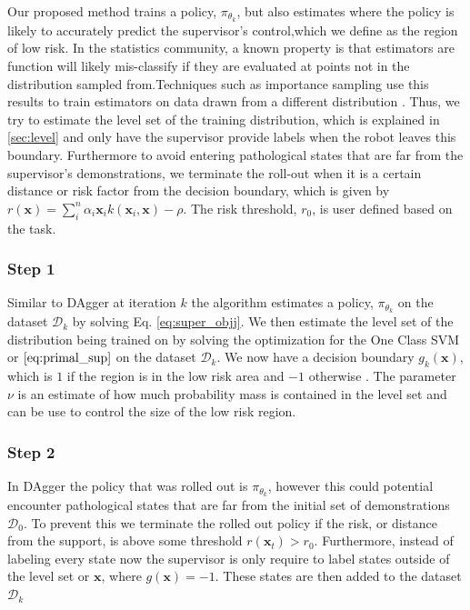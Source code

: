 \documentclass[10pt, conference]{ieeeconf}      %
\newcommand{\bx}{\mathbf{x}}
\begin{document}
Our proposed method trains a policy, $\pi_{\theta_k}$, but also estimates where the policy is likely to accurately predict the supervisor's control,which we define as the region of low risk.  In the statistics community, a known property is that estimators are function will likely mis-classify if they are evaluated at points not in the distribution sampled from.Techniques such as importance sampling use this results to train estimators on data drawn from a different distribution \cite{tokdar2010importance}.  Thus, we try to estimate the level set of the training distribution, which is explained in \ref{sec:level} and only have the supervisor provide labels when the robot leaves this boundary. Furthermore to avoid entering pathological states that are far from the supervisor's demonstrations, we terminate the roll-out when it is a certain distance or risk factor from the decision boundary, which is given by $r(\bx) = \sum_i^n \alpha_i \bx_i k(\bx_i,\bx)-\rho$. The risk threshold, $r_0$, is user defined based on the task. 

\subsubsection{Step 1}
Similar to DAgger at iteration $k$ the algorithm estimates a policy, $\pi_{\theta_k}$ on the dataset $\mathcal{D}_k$ by solving Eq. \ref{eq:super_objj}. We then estimate the level set of the distribution being trained on by solving the optimization for the One Class SVM or $\ref{eq:primal_sup}$ on the dataset $\mathcal{D}_k$. We now have a decision boundary $g_k(\bx)$, which is $1$ if the region is in the low risk area and $-1$ otherwise . The parameter $\nu$ is an estimate of how much probability mass is contained in the level set and can be use to control the size of the low risk region. 
 
 
 \subsubsection{Step 2}
 In DAgger the policy that was rolled out is $\pi_{\theta_k}$, however this could potential encounter pathological states that are far from the initial set of demonstrations $\mathcal{D}_0$. To prevent this we terminate the rolled out policy if the risk, or distance from the support, is above some threshold $r(\bx_t) > r_0$.  Furthermore, instead of labeling every state now the supervisor is only require to label states outside of the level set or $\bx$, where $g(\bx) = -1$.  These states are then added to the dataset $\mathcal{D}_{k}$
\end{document}
